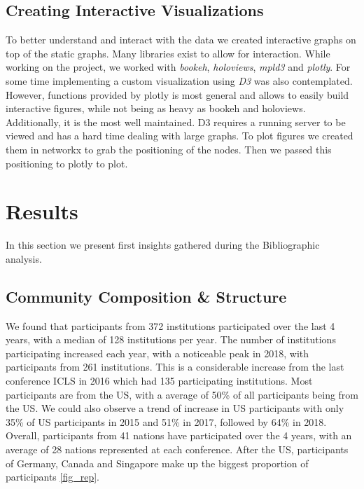 \documentclass[article,twocolumn]{IEEEtran}
\begin{document}
    \hypertarget{creating-interactive-visualizations}{%
\subsection{Creating Interactive
Visualizations}\label{creating-interactive-visualizations}}

To better understand and interact with the data we created interactive
graphs on top of the static graphs. Many libraries exist to allow for
interaction. While working on the project, we worked with \emph{bookeh},
\emph{holoviews}, \emph{mpld3} and \emph{plotly}. For some time
implementing a custom visualization using \emph{D3} was also
contemplated. However, functions provided by plotly is most general and
allows to easily build interactive figures, while not being as heavy as
bookeh and holoviews. Additionally, it is the most well maintained. D3
requires a running server to be viewed and has a hard time dealing with
large graphs. To plot figures we created them in networkx to grab the
positioning of the nodes. Then we passed this positioning to plotly to
plot.

    \hypertarget{results}{%
\section{Results}\label{results}}

In this section we present first insights gathered during the
Bibliographic analysis.


    \hypertarget{community-composition-structure}{%
\subsection{Community Composition \&
Structure}\label{community-composition-structure}}

We found that participants from 372 institutions participated over the
last 4 years, with a median of 128 institutions per year. The number of
institutions participating increased each year, with a noticeable peak
in 2018, with participants from 261 institutions. This is a considerable
increase from the last conference ICLS in 2016 which had 135
participating institutions. Most participants are from the US, with a
average of 50\% of all participants being from the US. We could also
observe a trend of increase in US participants with only 35\% of US
participants in 2015 and 51\% in 2017, followed by 64\% in 2018.
Overall, participants from 41 nations have participated over the 4
years, with an average of 28 nations represented at each conference.
After the US, participants of Germany, Canada and Singapore make up the
biggest proportion of participants \ref{fig_rep}.
\end{document}
